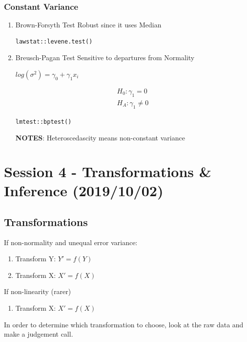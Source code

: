 \documentclass[11pt]{article}
\begin{document}
\subsubsection{Constant Variance}
\label{sec:orgaed6f73}
\begin{enumerate}
\item Brown-Forsyth Test
\label{sec:orgdee7802}
Robust since it uses Median
\begin{verbatim}
lawstat::levene.test()
\end{verbatim}
\item Breusch-Pagan Test
\label{sec:org400c909}
Sensitive to departures from Normality

\(log(\sigma^2) = \gamma_0 + \gamma_1 x_i\)

\begin{equation}
\begin{split}
H_0: \gamma_1 = 0\\
H_A: \gamma_1 \neq 0
\end{split}
\end{equation}

\begin{verbatim}
lmtest::bptest()
\end{verbatim}

\textbf{NOTES}: Heteroscedascity means non-constant variance
\end{enumerate}
\section{Session 4 - Transformations \& Inference (2019/10/02)}
\label{sec:org96408b7}
\subsection{Transformations}
\label{sec:org9381a74}
If non-normality and unequal error variance:
\begin{enumerate}
\item Transform Y: \(Y' = f(Y)\)
\item Transform X: \(X' = f(X)\)
\end{enumerate}

If non-linearity (rarer)
\begin{enumerate}
\item Transform X: \(X' = f(X)\)
\end{enumerate}

In order to determine which transformation to choose, look at the raw data and
make a judgement call.
\end{document}
